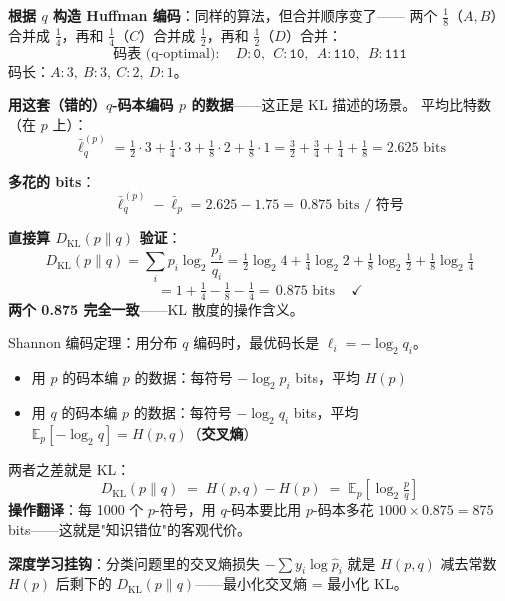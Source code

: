 \documentclass[12pt, a4paper]{ctexart}
\begin{document}
\begin{blackboard}

\textbf{根据 $q$ 构造 Huffman 编码}：同样的算法，但合并顺序变了——
两个 $\tfrac{1}{8}$（$A,B$）合并成 $\tfrac{1}{4}$，再和 $\tfrac{1}{4}$（$C$）合并成 $\tfrac{1}{2}$，再和 $\tfrac{1}{2}$（$D$）合并：
\[
\text{码表 (q-optimal)}:\quad D: \mathtt{0},\ \ C: \mathtt{10},\ \ A: \mathtt{110},\ \ B: \mathtt{111}
\]
码长：$A\!:\!3,\ B\!:\!3,\ C\!:\!2,\ D\!:\!1$。

\textbf{用这套（错的）$q$-码本编码 $p$ 的数据}——这正是 KL 描述的场景。
平均比特数（在 $p$ 上）：
\[
\bar\ell_q^{(p)} = \tfrac{1}{2}\!\cdot\!3 + \tfrac{1}{4}\!\cdot\!3 + \tfrac{1}{8}\!\cdot\!2 + \tfrac{1}{8}\!\cdot\!1
= \tfrac{3}{2} + \tfrac{3}{4} + \tfrac{1}{4} + \tfrac{1}{8}
= 2.625 \text{ bits}
\]

\textbf{多花的 bits}：
\[
\bar\ell_q^{(p)} - \bar\ell_p = 2.625 - 1.75 = \boxed{\,0.875\text{ bits / 符号}\,}
\]

\textbf{直接算 $D_{\mathrm{KL}}(p\|q)$ 验证}：
\[
D_{\mathrm{KL}}(p\|q) = \sum_i p_i\log_2\!\frac{p_i}{q_i}
= \tfrac{1}{2}\log_2 4 + \tfrac{1}{4}\log_2 2 + \tfrac{1}{8}\log_2 \tfrac{1}{2} + \tfrac{1}{8}\log_2 \tfrac{1}{4}
\]
\[
= 1 + \tfrac{1}{4} - \tfrac{1}{8} - \tfrac{1}{4} = \boxed{\,0.875\text{ bits}\,}\quad\checkmark
\]
\textbf{两个 0.875 完全一致}——KL 散度的操作含义。

\end{blackboard}

\begin{keypoint}

Shannon 编码定理：用分布 $q$ 编码时，最优码长是 $\ell_i = -\log_2 q_i$。
\begin{itemize}
    \item 用 $p$ 的码本编 $p$ 的数据：每符号 $-\log_2 p_i$ bits，平均 $H(p)$
    \item 用 $q$ 的码本编 $p$ 的数据：每符号 $-\log_2 q_i$ bits，平均 $\mathbb{E}_p[-\log_2 q] = H(p, q)$（\textbf{交叉熵}）
\end{itemize}
两者之差就是 KL：
\[
D_{\mathrm{KL}}(p\|q) \;=\; H(p,q) - H(p) \;=\; \mathbb{E}_p\!\left[\log_2\!\tfrac{p}{q}\right]
\]
\textbf{操作翻译}：每 1000 个 $p$-符号，用 $q$-码本要比用 $p$-码本多花
$1000 \times 0.875 = 875$ bits——这就是"知识错位"的客观代价。

\textbf{深度学习挂钩}：分类问题里的交叉熵损失 $-\sum y_i \log \hat p_i$ 就是 $H(p, q)$
减去常数 $H(p)$ 后剩下的 $D_{\mathrm{KL}}(p\|q)$——最小化交叉熵 = 最小化 KL。
\end{keypoint}
\end{document}

